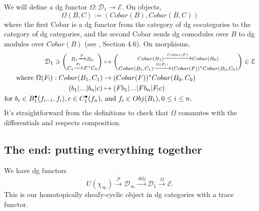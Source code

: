 We will define a dg functor $\Omega: 
\mathcal{D}_1 \to \mathcal{E}$. 
On objects, $$\Omega(B,C) := 
(Cobar(B), Cobar(B,C))$$ where the first 
Cobar is a dg functor from the category of 
dg cocategories to the category of dg 
categories, and the second Cobar sends 
dg comodules over $B$ to dg modules over 
$Cobar(B)$ (see \cite{T}, Section 4.6). 
On morphisms, 
\begin{align*}
\mathcal{D}_1 \ni
\bigg(\substack{
	B_1 \xrightarrow{F} B_0\\
	C_1 \xrightarrow{F_!} F^*C_0}\bigg)
& \mapsto
\bigg(\substack{
  Cobar(B_1)\xrightarrow{Cobar(F)}Cobar(B_0)\\
  Cobar(B_1,C_1) \xrightarrow{\Omega(F_!)} 
  (Cobar(F))^*Cobar(B_0,C_0)}\bigg)
\in \mathcal{E}  \\
\textrm{where } 
\Omega(F_!): Cobar(B_1,C_1)
& \to
(Cobar(F))^*Cobar(B_0,C_0)\\
(b_1|\smdots|b_n|c)
&\mapsto
(Fb_1|\smdots|Fb_n|F_!c)\\
\textrm{for } 
  b_i \in B_1^\bullet(f_{i-1},f_i),
  c \in C_1^\bullet(f_n), 
&\textrm{ and } f_i \in 
  Obj(B_1), 0 \leq i \leq n.
\end{align*}
It's straightforward from the definitions 
to check that $\Omega$ commutes with 
the differentials and respects composition.

\subsection{The end: putting everything together}
We have dg functors
$$
U(\chi_\infty) \xrightarrow{\tilde{\mathcal{F}}}
\mathcal{D}_\infty \xrightarrow{Adj}
\mathcal{D}_1 \xrightarrow{\Omega}
\mathcal{E}.
$$
This is our homotopically sheafy-cyclic object 
in dg categories with a trace functor.